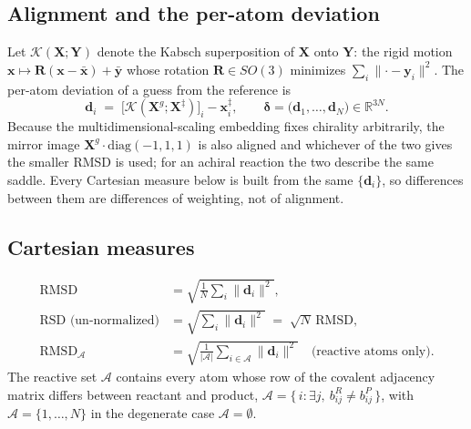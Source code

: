 \documentclass[11pt]{article}
\begin{document}
\subsection{Alignment and the per-atom deviation}
Let $\mathcal{K}(\mathbf{X};\mathbf{Y})$ denote the Kabsch superposition of
$\mathbf{X}$ onto $\mathbf{Y}$: the rigid motion $\mathbf{x}\mapsto
\mathbf{R}(\mathbf{x}-\bar{\mathbf{x}})+\bar{\mathbf{y}}$ whose rotation
$\mathbf{R}\in SO(3)$ minimizes $\sum_i\lVert\cdot-\mathbf{y}_i\rVert^{2}$. The
per-atom deviation of a guess from the reference is
\begin{equation}
\mathbf{d}_i \;=\; \bigl[\mathcal{K}(\mathbf{X}^{g};\mathbf{X}^{\ddagger})\bigr]_i
- \mathbf{x}^{\ddagger}_i ,
\qquad
\boldsymbol{\delta} = \bigl(\mathbf{d}_1,\dots,\mathbf{d}_N\bigr)\in\mathbb{R}^{3N}.
\end{equation}
Because the multidimensional-scaling embedding fixes chirality arbitrarily, the
mirror image $\mathbf{X}^{g}\!\cdot\mathrm{diag}(-1,1,1)$ is also aligned and
whichever of the two gives the smaller RMSD is used; for an achiral reaction the
two describe the same saddle. Every Cartesian measure below is built from the
same $\{\mathbf{d}_i\}$, so differences between them are differences of weighting,
not of alignment.

\subsection{Cartesian measures}
\begin{align}
\text{RMSD} &= \sqrt{\tfrac{1}{N}\textstyle\sum_{i}\lVert\mathbf{d}_i\rVert^{2}}, \\
\text{RSD (un-normalized)} &= \sqrt{\textstyle\sum_{i}\lVert\mathbf{d}_i\rVert^{2}}
 \;=\; \sqrt{N}\,\text{RMSD}, \\
\text{RMSD}_{\mathcal{A}} &= \sqrt{\tfrac{1}{\lvert\mathcal{A}\rvert}
 \textstyle\sum_{i\in\mathcal{A}}\lVert\mathbf{d}_i\rVert^{2}} \quad
 \text{(reactive atoms only)} .
\end{align}
The reactive set $\mathcal{A}$ contains every atom whose row of the covalent
adjacency matrix differs between reactant and product,
$\mathcal{A}=\{\,i : \exists j,\ b^{R}_{ij}\neq b^{P}_{ij}\,\}$, with
$\mathcal{A}=\{1,\dots,N\}$ in the degenerate case $\mathcal{A}=\emptyset$.
\end{document}
